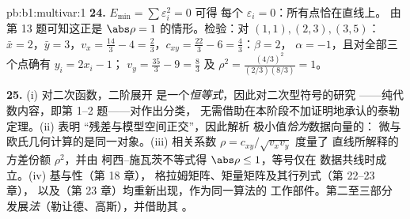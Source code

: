 \begin{solution}{pb:b1:multivar:1}
\textbf{24.} $E_{\min} = \sum\varepsilon_i^2 = 0$ 可得
每个 $\varepsilon_i = 0$：所有点恰在直线上。
由第 13 题可知这正是 $\abs\rho = 1$ 的情形。检验：对 $(1,1), (2,3),
(3,5)$：$\bar x = 2$，$\bar y = 3$，$v_x = \frac{14}3 - 4 =
\frac23$，$c_{xy} = \frac{22}3 - 6 = \frac43$：$\beta = 2$，
$\alpha = -1$，且对全部三个点确有 $y_i = 2x_i - 1$；
$v_y = \frac{35}3 - 9 = \frac83$ 及 $\rho^2 =
\frac{(4/3)^2}{(2/3)(8/3)} = 1$。

\textbf{25.} (i) 对二次函数，二阶展开
是一个\emph{恒等式}，因此对二次型符号的研究
——纯代数内容，即第 1--2 题——对作出分类，
无需借助在本阶段不加证明地承认的泰勒定理。(ii) 表明
“残差与模型空间正交”，因此解析
极小值\emph{恰为}数据向量的：
微与欧氏几何计算的是同一对象。(iii)
相关系数 $\rho = c_{xy}/\sqrt{v_xv_y}$ 度量了
直线所解释的方差份额 $\rho^2$，并由
柯西–施瓦茨不等式得 $\abs\rho \leq 1$，等号仅在
数据共线时成立。(iv) 基与性（第 18 章），
格拉姆矩阵、矩量矩阵及其行列式（第 22--23 章），
以及（第 23 章）均重新出现，作为同一算法的
工作部件。第二至三部分
发展\emph{法}（勒让德、高斯），并借助其
\emph{}。
\end{solution}
